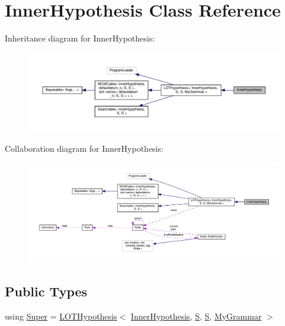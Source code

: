 \hypertarget{class_inner_hypothesis}{}\section{Inner\+Hypothesis Class Reference}
\label{class_inner_hypothesis}


Inheritance diagram for Inner\+Hypothesis\+:\nopagebreak
\begin{figure}[H]
\begin{center}
\leavevmode
\includegraphics[width=350pt]{class_inner_hypothesis__inherit__graph}
\end{center}
\end{figure}


Collaboration diagram for Inner\+Hypothesis\+:\nopagebreak
\begin{figure}[H]
\begin{center}
\leavevmode
\includegraphics[width=350pt]{class_inner_hypothesis__coll__graph}
\end{center}
\end{figure}
\subsection*{Public Types}
\begin{DoxyCompactItemize}
\item 
using \hyperlink{class_inner_hypothesis_a1a69a8dd433b64b725be0b2436d6df0c}{Super} = \hyperlink{class_l_o_t_hypothesis}{L\+O\+T\+Hypothesis}$<$ \hyperlink{class_inner_hypothesis}{Inner\+Hypothesis}, \hyperlink{_formal_language_theory-_complex_2_main_8cpp_a51c40915539205f0b5add30b0d68a4cb}{S}, \hyperlink{_formal_language_theory-_complex_2_main_8cpp_a51c40915539205f0b5add30b0d68a4cb}{S}, \hyperlink{class_my_grammar}{My\+Grammar} $>$
\end{DoxyCompactItemize}
